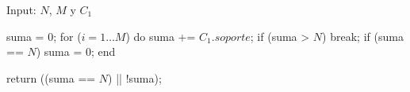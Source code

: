 Input: $N$, $M$ y $C_1$

suma = 0;
for ($i = 1 \ldots M$) do
  suma += $C_1.soporte$;
  if (suma > $N$)
    break;
  if (suma == $N$)
    suma = 0;
end

return ((suma == $N$) || !suma);